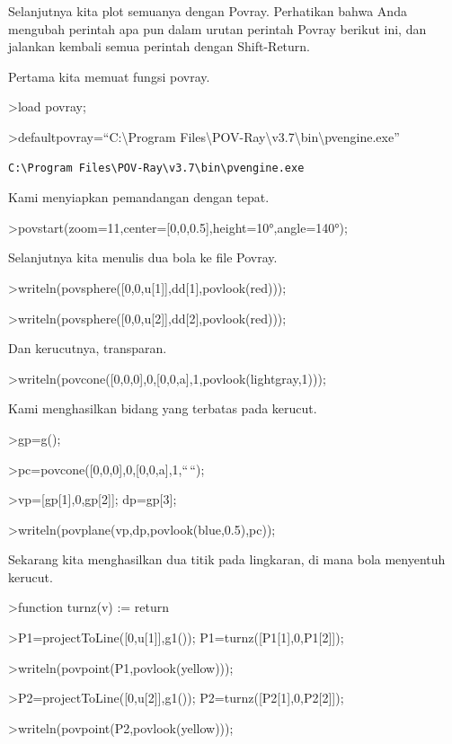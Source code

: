 \documentclass[
]{book}
\begin{document}
Selanjutnya kita plot semuanya dengan Povray. Perhatikan bahwa Anda mengubah perintah apa pun dalam urutan perintah Povray berikut ini, dan jalankan kembali semua perintah dengan Shift-Return.

Pertama kita memuat fungsi povray.

\textgreater load povray;

\textgreater defaultpovray=``C:\textbackslash Program Files\textbackslash POV-Ray\textbackslash v3.7\textbackslash bin\textbackslash pvengine.exe''

\begin{verbatim}
C:\Program Files\POV-Ray\v3.7\bin\pvengine.exe
\end{verbatim}

Kami menyiapkan pemandangan dengan tepat.

\textgreater povstart(zoom=11,center={[}0,0,0.5{]},height=10°,angle=140°);

Selanjutnya kita menulis dua bola ke file Povray.

\textgreater writeln(povsphere({[}0,0,u{[}1{]}{]},dd{[}1{]},povlook(red)));

\textgreater writeln(povsphere({[}0,0,u{[}2{]}{]},dd{[}2{]},povlook(red)));

Dan kerucutnya, transparan.

\textgreater writeln(povcone({[}0,0,0{]},0,{[}0,0,a{]},1,povlook(lightgray,1)));

Kami menghasilkan bidang yang terbatas pada kerucut.

\textgreater gp=g();

\textgreater pc=povcone({[}0,0,0{]},0,{[}0,0,a{]},1,``\,``);

\textgreater vp={[}gp{[}1{]},0,gp{[}2{]}{]}; dp=gp{[}3{]};

\textgreater writeln(povplane(vp,dp,povlook(blue,0.5),pc));

Sekarang kita menghasilkan dua titik pada lingkaran, di mana bola menyentuh kerucut.

\textgreater function turnz(v) := return

\textgreater P1=projectToLine({[}0,u{[}1{]}{]},g1()); P1=turnz({[}P1{[}1{]},0,P1{[}2{]}{]});

\textgreater writeln(povpoint(P1,povlook(yellow)));

\textgreater P2=projectToLine({[}0,u{[}2{]}{]},g1()); P2=turnz({[}P2{[}1{]},0,P2{[}2{]}{]});

\textgreater writeln(povpoint(P2,povlook(yellow)));
\end{document}
